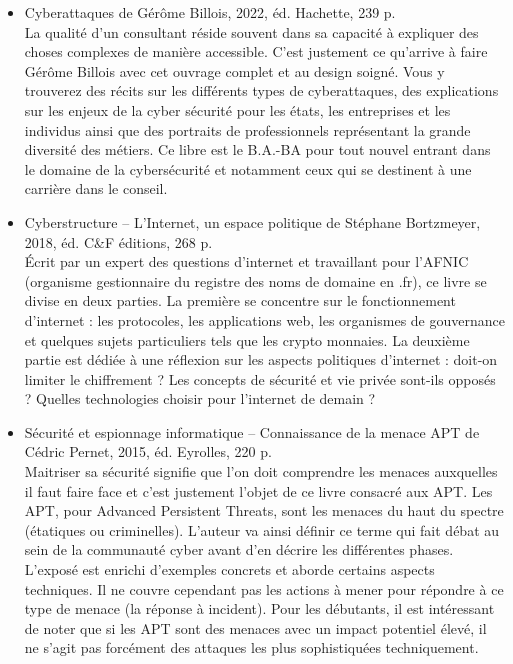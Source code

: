 \documentclass[a4paper]{article}
\begin{document}
\begin{itemize}

\item Cyberattaques de Gérôme Billois, 2022, éd. Hachette, 239 p.
\\
La qualité d’un consultant réside souvent dans sa capacité à expliquer des choses complexes de manière accessible. C’est justement ce qu’arrive à faire Gérôme Billois avec cet ouvrage complet et au design soigné. Vous y trouverez des récits sur les différents types de cyberattaques, des explications sur les enjeux de la cyber sécurité pour les états, les entreprises et les individus ainsi que des portraits de professionnels représentant la grande diversité des métiers. Ce libre est le B.A.-BA pour tout nouvel entrant dans le domaine de la cybersécurité et notamment ceux qui se destinent à une carrière dans le conseil.



\item Cyberstructure – L’Internet, un espace politique de Stéphane Bortzmeyer, 2018, éd. C&F éditions, 268 p.
\\
Écrit par un expert des questions d’internet et travaillant pour l’AFNIC (organisme gestionnaire du registre des noms de domaine en .fr), ce livre se divise en deux parties. La première se concentre sur le fonctionnement d’internet : les protocoles, les applications web, les organismes de gouvernance et quelques sujets particuliers tels que les crypto monnaies. La deuxième partie est dédiée à une réflexion sur les aspects politiques d’internet : doit-on limiter le chiffrement ? Les concepts de sécurité et vie privée sont-ils opposés ? Quelles technologies choisir pour l’internet de demain ?


\item Sécurité et espionnage informatique – Connaissance de la menace APT de Cédric Pernet, 2015, éd. Eyrolles, 220 p.
\\
Maitriser sa sécurité signifie que l’on doit comprendre les menaces auxquelles il faut faire face et c’est justement l’objet de ce livre consacré aux APT. Les APT, pour Advanced Persistent Threats, sont les menaces du haut du spectre (étatiques ou criminelles). L’auteur va ainsi définir ce terme qui fait débat au sein de la communauté cyber avant d’en décrire les différentes phases. L’exposé est enrichi d’exemples concrets et aborde certains aspects techniques. Il ne couvre cependant pas les actions à mener pour répondre à ce type de menace (la réponse à incident). Pour les débutants, il est intéressant de noter que si les APT sont des menaces avec un impact potentiel élevé, il ne s’agit pas forcément des attaques les plus sophistiquées techniquement.



\end{itemize}
\end{document}
